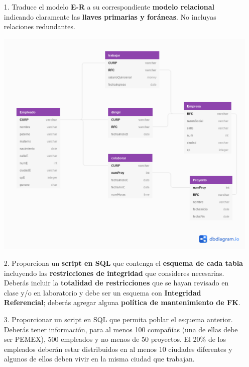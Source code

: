 \documentclass[12pt, letterpaper]{article}
\begin{document}
\begin{itemize}
	\item[1.] Traduce el modelo \textbf{E-R} a su correspondiente \textbf{modelo relacional} indicando claramente las 
			  \textbf{llaves primarias y foráneas}. No incluyas relaciones redundantes.
			
				\begin{center}
					\includegraphics[scale=0.2]{Trabajo.png}
				\end{center}
	
	\item[2.] Proporciona un \textbf{script en SQL} que contenga el \textbf{esquema de cada tabla} incluyendo las \textbf{restricciones
			  de integridad} que consideres necesarias. Deberás incluir la \textbf{totalidad de restricciones} que se hayan
	          revisado en clase y/o en laboratorio y debe ser un esquema con \textbf{Integridad Referencial}; deberás
			  agregar alguna \textbf{política de mantenimiento de FK}.
			  
		

		\item[3.] Proporcionar un script en SQL que permita poblar el esquema anterior. \\
		Deberás tener información, para al menos 100 compañías (una de ellas debe ser PEMEX), 500
		empleados y no menos de 50 proyectos. El 20\% de los empleados deberán estar distribuidos en al
		menos 10 ciudades diferentes y algunos de ellos deben vivir en la misma ciudad que trabajan.


\end{itemize}
\end{document}
